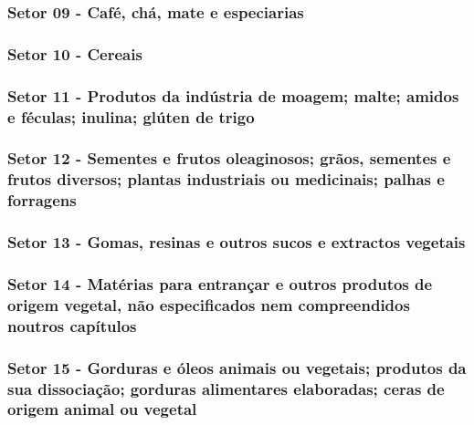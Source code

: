  
\subsubsection{Setor 09 - Café, chá, mate e especiarias}

 

\newpage

\subsubsection{Setor 10 - Cereais}



\newpage

\subsubsection{Setor 11 - Produtos da indústria de moagem; malte; amidos e féculas; inulina; glúten de trigo}



\newpage

\subsubsection{Setor 12 - Sementes e frutos oleaginosos; grãos, sementes e frutos diversos; plantas industriais ou medicinais; palhas e forragens}



\newpage

\subsubsection{Setor 13 - Gomas, resinas e outros sucos e extractos vegetais}



\subsubsection{Setor 14 - Matérias para entrançar e outros produtos de origem vegetal, não especificados nem compreendidos noutros capítulos}



\newpage

\subsubsection{Setor 15 - Gorduras e óleos animais ou vegetais; produtos da sua dissociação; gorduras alimentares elaboradas; ceras de origem animal ou vegetal}

 